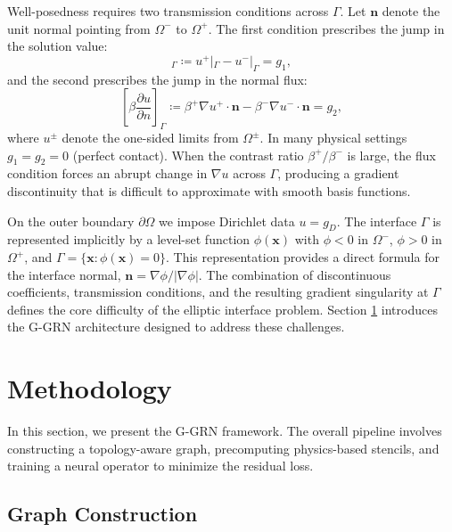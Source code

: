 \documentclass[11pt]{article}
\theoremstyle{definition}
\theoremstyle{remark}
\theoremstyle{plain}
\begin{document}
Well-posedness requires two transmission conditions across $\Gamma$. Let $\mathbf{n}$ denote the unit normal pointing from $\Omega^-$ to $\Omega^+$. The first condition prescribes the jump in the solution value:
\begin{equation}
    [u]_\Gamma \coloneqq u^+|_\Gamma - u^-|_\Gamma = g_1,
\end{equation}
and the second prescribes the jump in the normal flux:
\begin{equation}
    \left[\beta \frac{\partial u}{\partial n}\right]_\Gamma \coloneqq \beta^+ \nabla u^+ \cdot \mathbf{n} - \beta^- \nabla u^- \cdot \mathbf{n} = g_2,
\end{equation}
where $u^\pm$ denote the one-sided limits from $\Omega^\pm$. In many physical settings $g_1 = g_2 = 0$ (perfect contact). When the contrast ratio $\beta^+/\beta^-$ is large, the flux condition forces an abrupt change in $\nabla u$ across $\Gamma$, producing a gradient discontinuity that is difficult to approximate with smooth basis functions.

On the outer boundary $\partial\Omega$ we impose Dirichlet data $u = g_D$. The interface $\Gamma$ is represented implicitly by a level-set function $\phi(\mathbf{x})$ with $\phi < 0$ in $\Omega^-$, $\phi > 0$ in $\Omega^+$, and $\Gamma = \{\mathbf{x} : \phi(\mathbf{x}) = 0\}$. This representation provides a direct formula for the interface normal, $\mathbf{n} = \nabla\phi / |\nabla\phi|$. The combination of discontinuous coefficients, transmission conditions, and the resulting gradient singularity at $\Gamma$ defines the core difficulty of the elliptic interface problem. Section \ref{sec:method} introduces the G-GRN architecture designed to address these challenges. 

\section{Methodology}
\label{sec:method}

In this section, we present the G-GRN framework. The overall pipeline involves constructing a topology-aware graph, precomputing physics-based stencils, and training a neural operator to minimize the residual loss.

\subsection{Graph Construction}
\label{sec:graph_construction}
\end{document}
